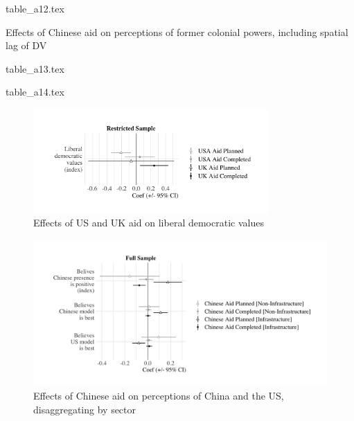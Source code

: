 \documentclass[9pt]{article}
\begin{document}
\noindent {}
{table_a12.tex} %

\newpage %

\setlength{\tabcolsep}{5pt}
\begin{table}[H]
\caption{Effects of Chinese aid on perceptions of former colonial powers, including spatial lag of DV}
\label{reg}
\centering
{table_a13.tex} %
\end{table}

\noindent {}
{table_a14.tex} %


\begin{figure}[H]
\centering
\includegraphics[width=0.8\textwidth]{figures/figure_a21.png} %
\caption{Effects of US and UK aid on liberal democratic values}
\end{figure}

\begin{figure}[H]
\centering
\includegraphics[width=1\textwidth]{figures/figure_a17.png} %
\caption{Effects of Chinese aid on perceptions of China and the US, disaggregating by sector}
\end{figure}
\end{document}

